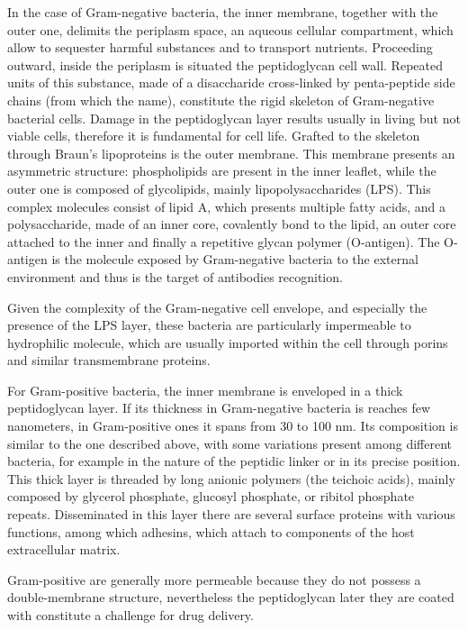In the case of Gram-negative bacteria, the inner membrane, together with the outer one, delimits the periplasm space, an aqueous cellular compartment, which allow to sequester harmful substances and to transport nutrients.
%
Proceeding outward, inside the periplasm is situated the peptidoglycan cell wall. Repeated units of this substance, made of a disaccharide cross-linked by penta-peptide side chains (from which the name), constitute the rigid skeleton of Gram-negative bacterial cells. Damage in the peptidoglycan layer results usually in living but not viable cells, therefore it is fundamental for cell life.
%
Grafted to the skeleton through Braun’s lipoproteins is the outer membrane. This membrane presents an asymmetric structure: phospholipids are present in the inner leaflet, while the outer one is composed of glycolipids, mainly lipopolysaccharides (LPS). This complex molecules consist of lipid A, which presents multiple fatty acids, and a polysaccharide, made of an inner core, covalently bond to the lipid, an outer core attached to the inner and finally a repetitive glycan polymer (O-antigen). The O-antigen is the molecule exposed by Gram-negative bacteria to the external environment and thus is the target of antibodies recognition. 

Given the complexity of the Gram-negative cell envelope, and especially the presence of the LPS layer, these bacteria are particularly impermeable to hydrophilic molecule, which are usually imported within the cell through porins and similar transmembrane proteins.

For Gram-positive bacteria, the inner membrane is enveloped in a thick peptidoglycan layer. If its thickness in Gram-negative bacteria is reaches few nanometers, in Gram-positive ones it spans from 30 to 100 nm. Its composition is similar to the one described above, with some variations present among different bacteria, for example in the nature of the peptidic linker or in its precise position. This thick layer is threaded by long anionic polymers (the teichoic acids), mainly composed by glycerol phosphate, glucosyl phosphate, or ribitol phosphate repeats. Disseminated in this layer there are several surface proteins with various functions, among which adhesins, which attach to components of the host extracellular matrix.

Gram-positive are generally more permeable because they do not possess a double-membrane structure, nevertheless the peptidoglycan later they are coated with constitute a challenge for drug delivery.


